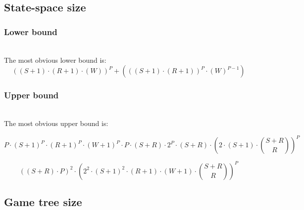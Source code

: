 \documentclass[conference]{IEEEtran}
\begin{document}
%
%


\subsection{State-space size}

\subsubsection{Lower bound}
\ \\The most obvious lower bound is:
$$((S+1) \cdot (R+1) \cdot (W))^P + (((S+1) \cdot (R+1))^P \cdot (W)^{P-1})$$


%

\subsubsection{Upper bound}
\ \\The most obvious upper bound is:

$$P \cdot (S+1)^P \cdot (R+1)^P \cdot (W+1)^P \cdot P \cdot (S+R) \cdot 2^P \cdot (S+R) \cdot (2 \cdot (S+1) \cdot \binom {S+R} {R})^P$$

$$  ((S+R) \cdot P)^2 \cdot (2^2 \cdot(S+1)^2 \cdot (R+1) \cdot (W+1) \cdot \binom {S+R} {R})^P$$

%
%



\subsection{Game tree size}
\end{document}
